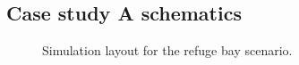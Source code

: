 \begin{appendices}
\chapter{Case study A schematics}
\newpage
\begin{figure}[h!]
	\centering
	\caption{Simulation layout for the refuge bay scenario.}
	\label{fig: KUS Baseline}
\end{figure}


\end{appendices}

